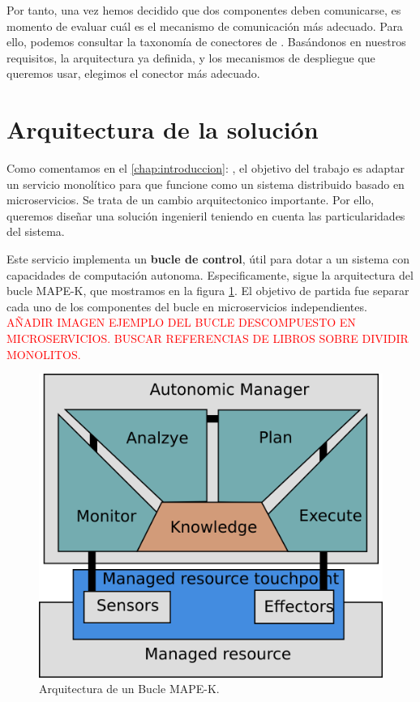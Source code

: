 Por tanto, una vez hemos decidido que dos componentes deben comunicarse, es momento de evaluar cuál es el mecanismo de comunicación más adecuado. Para ello, podemos consultar la taxonomía de conectores de \cite{mehtaTaxonomySoftwareConnectors2000}. Basándonos en nuestros requisitos, la arquitectura ya definida, y los mecanismos de despliegue que queremos usar, elegimos el conector más adecuado.

\section{Arquitectura de la solución}

Como comentamos en el \autoref{chap:introduccion}: , el objetivo del trabajo es adaptar un servicio monolítico para que funcione como un sistema distribuido basado en microservicios. Se trata de un cambio arquitectonico importante. Por ello, queremos diseñar una solución ingenieril teniendo en cuenta las particularidades del sistema.

Este servicio implementa un \textbf{bucle de control}, útil para dotar a un sistema con capacidades de computación autonoma. Especificamente, sigue la arquitectura del bucle MAPE-K\cite{ArchitecturalBlueprintAutonomic2006,fonsServiciosAdaptivereadyPara2021}, que mostramos en la figura \ref{fig:bucle-mapek2}. El objetivo de partida fue separar cada uno de los componentes del bucle en microservicios independientes.  \textcolor{red}{AÑADIR IMAGEN EJEMPLO DEL BUCLE DESCOMPUESTO EN MICROSERVICIOS. BUSCAR REFERENCIAS DE LIBROS SOBRE DIVIDIR MONOLITOS.}

\begin{figure}[h]
  \centering
  \includegraphics[scale=0.6]{01_introduccion/images/bucle-mape-k.png}
  \caption[Arquitectura de un Bucle MAPE-K.]{Arquitectura de un Bucle MAPE-K.\footnotemark}
  \label{fig:bucle-mapek2}
\end{figure}

